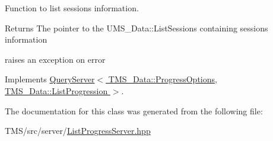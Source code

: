 Function to list sessions information. 

\begin{DoxyReturn}{Returns}
The pointer to the UMS\_\-Data::ListSessions containing sessions information 

raises an exception on error 
\end{DoxyReturn}


Implements \hyperlink{classQueryServer_a2ad0f3f1b75e6f0705a9edbe4bab76b0}{QueryServer$<$ TMS\_\-Data::ProgressOptions, TMS\_\-Data::ListProgression $>$}.



The documentation for this class was generated from the following file:\begin{DoxyCompactItemize}
\item 
TMS/src/server/\hyperlink{ListProgressServer_8hpp}{ListProgressServer.hpp}\end{DoxyCompactItemize}
